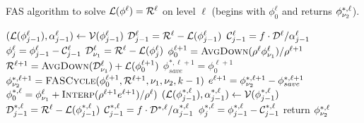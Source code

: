 \documentclass[11pt]{article}
\begin{document}
\begin{algorithm}[H]
\caption{FAS algorithm to solve ${\cal L}({\phi}^{\ell}) = {\cal R}^{\ell}$ on
       level $\ell$ (begins with ${\phi}^{\ell}_{0}$ and returns ${\phi}^{*,\ell}_{{\nu_2}}$).
}
\begin{algorithmic}
      \State $({\cal L} ({\phi}^{\ell}_{j-1}), \alpha^{\ell}_{j-1})
             \gets {\cal V}(\phi^{\ell}_{j-1})$
      \State ${\cal D}^{\ell}_{j-1} = {\cal R}^{\ell} - {\cal L}({\phi}^{\ell}_{j-1})$
      \State ${\cal C}^{\ell}_{j-1} = f \cdot {\cal D}^{\ell} / {\alpha}^{\ell}_{j-1}$ 
      \State ${\phi}^{\ell}_{j} = {\phi}^{\ell}_{j-1} - {\cal C}^{\ell}_{j-1}$
   \EndFor
   \State ${\cal D}^{\ell}_{{\nu_1}} = {\cal R}^{\ell} - {\cal L} ({\phi}^{\ell}_{j})$
   \State
      \State ${\phi}^{\ell+1}_{0} = \mbox{\sc AvgDown}({\rho}^{\ell} {\phi}^{\ell}_{{\nu_1}}) / {\rho}^{\ell+1}$
      \State ${\cal R}^{\ell+1} = \mbox{\sc AvgDown}({\cal D}^{\ell}_{{\nu_1}}) + {\cal L} ({\phi}^{\ell+1}_{0})$
      \State ${\phi}^{*,\ell+1}_{save} = {\phi}^{\ell+1}_{0}$
      \State ${\phi}^{*,\ell+1}_{{\nu_2}} = \mbox{\sc FASCycle}({\phi}^{\ell+1}_{0},{\cal R}^{\ell+1},{\nu_1},{\nu_2},k-1)$
      \State ${e}^{\ell+1} = {\phi}^{*,\ell+1}_{{\nu_2}} - {\phi}^{*,\ell+1}_{save}$
      \State ${\phi}^{*,\ell}_{0} = {\phi}^{\ell}_{{\nu_1}} + \mbox{\sc Interp}({\rho}^{\ell+1} {e}^{\ell+1}) / {\rho}^{\ell})$
   \EndIf
   \State
      \State $({\cal L} ({\phi}^{*,\ell}_{j-1}), \alpha^{*,\ell}_{j-1})
             \gets {\cal V}(\phi^{*,\ell}_{j-1})$
      \State ${\cal D}^{*,\ell}_{j-1} = {\cal R}^{\ell} - {\cal L}({\phi}^{*,\ell}_{j-1})$
      \State ${\cal C}^{*,\ell}_{j-1} = f \cdot {\cal D}^{*,\ell} / {\alpha}^{*,\ell}_{j-1}$ 
      \State ${\phi}^{*,\ell}_{j} = {\phi}^{*,\ell}_{j-1} - {\cal C}^{*,\ell}_{j-1}$
   \EndFor
   \State return $\phi^{*,\ell}_{{\nu_2}}$
\EndProcedure
\end{algorithmic}
\end{algorithm}
\end{document}
